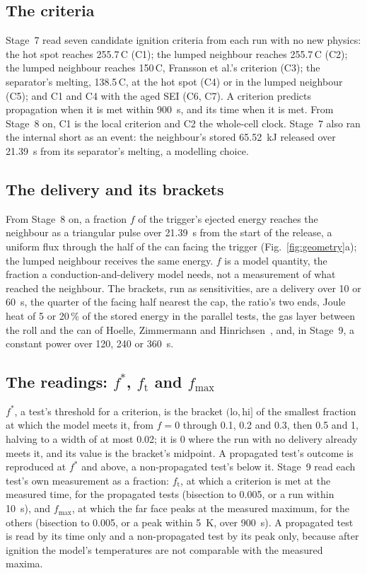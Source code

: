 \documentclass[preprint,12pt]{elsarticle}
\newcommand{\degC}{\,\textdegree C}
\newcommand{\fs}{f^{*}}
\newcommand{\ft}{f_{\mathrm{t}}}
\newcommand{\fmax}{f_{\mathrm{max}}}
\begin{document}
\subsection{The criteria}
\label{sec:criteria}

Stage~7 read seven candidate ignition criteria from each run with no new physics: the hot spot reaches 255.7\degC{} (C1); the lumped neighbour reaches 255.7\degC{} (C2); the lumped neighbour reaches 150\degC, Fransson et al.'s criterion (C3); the separator's melting, 138.5\degC, at the hot spot (C4) or in the lumped neighbour (C5); and C1 and C4 with the aged SEI (C6, C7). A criterion predicts propagation when it is met within 900~s, and its time when it is met. From Stage~8 on, C1 is the local criterion and C2 the whole-cell clock. Stage~7 also ran the internal short as an event: the neighbour's stored 65.52~kJ released over 21.39~s from its separator's melting, a modelling choice.

\subsection{The delivery and its brackets}
\label{sec:delivery}

From Stage~8 on, a fraction $f$ of the trigger's ejected energy reaches the neighbour as a triangular pulse over 21.39~s from the start of the release, a uniform flux through the half of the can facing the trigger (Fig.~\ref{fig:geometry}a); the lumped neighbour receives the same energy. $f$ is a model quantity, the fraction a conduction-and-delivery model needs, not a measurement of what reached the neighbour. The brackets, run as sensitivities, are a delivery over 10 or 60~s, the quarter of the facing half nearest the cap, the ratio's two ends, Joule heat of 5 or 20\,\% of the stored energy in the parallel tests, the gas layer between the roll and the can of Hoelle, Zimmermann and Hinrichsen~\cite{hoelle2023simulation}, and, in Stage~9, a constant power over 120, 240 or 360~s.

\subsection{The readings: \texorpdfstring{$\fs$, $\ft$ and $\fmax$}{f*, f\_t and f\_max}}
\label{sec:readings}

$\fs$, a test's threshold for a criterion, is the bracket $(\mathrm{lo},\mathrm{hi}]$ of the smallest fraction at which the model meets it, from $f=0$ through 0.1, 0.2 and 0.3, then 0.5 and 1, halving to a width of at most 0.02; it is 0 where the run with no delivery already meets it, and its value is the bracket's midpoint. A propagated test's outcome is reproduced at $\fs$ and above, a non-propagated test's below it. Stage~9 read each test's own measurement as a fraction: $\ft$, at which a criterion is met at the measured time, for the propagated tests (bisection to 0.005, or a run within 10~s), and $\fmax$, at which the far face peaks at the measured maximum, for the others (bisection to 0.005, or a peak within 5~K, over 900~s). A propagated test is read by its time only and a non-propagated test by its peak only, because after ignition the model's temperatures are not comparable with the measured maxima.
\end{document}
